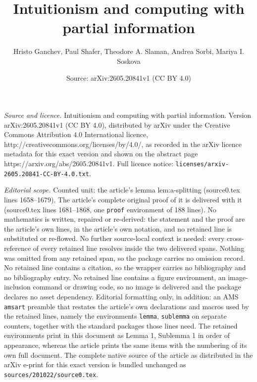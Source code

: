 \documentclass[10pt,a4paper]{amsart}
\title{Intuitionism and computing with partial information}
\author{Hristo Ganchev, Paul Shafer, Theodore A. Slaman, Andrea Sorbi, Mariya I. Soskova}
\date{Source: arXiv:2605.20841v1 (CC BY 4.0)}
\begin{document}
\maketitle

\noindent\emph{Source and licence.} Intuitionism and computing with partial information. Version arXiv:2605.20841v1 (CC BY 4.0), distributed by arXiv under the Creative Commons Attribution 4.0 International licence, http://creativecommons.org/licenses/by/4.0/, as recorded in the arXiv licence metadata for this exact version and shown on the abstract page https://arxiv.org/abs/2605.20841v1. Full licence notice: \texttt{licenses/arxiv-2605.20841-CC-BY-4.0.txt}.\par\smallskip

\noindent\textit{Editorial scope.} Counted unit: the article's lemma lem:a-splitting (source0.tex lines 1658--1679). The article's complete original proof of it is delivered with it (source0.tex lines 1681--1868, one \texttt{proof} environment of 188 lines). No mathematics is written, repaired or re-derived: the statement and the proof are the article's own lines, in the article's own notation, and no retained line is substituted or re-flowed.  No further source-local context is needed: every cross-reference of every retained line resolves inside the two delivered spans.  Nothing was omitted from any retained span, so the package carries no omission record.  No retained line contains a citation, so the wrapper carries no bibliography and no bibliography entry.  No retained line contains a figure environment, an image-inclusion command or drawing code, so no image is delivered and the package declares no asset dependency.  Editorial formatting only, in addition: an AMS \texttt{amsart} preamble that restates the article's own declarations and macros used by the retained lines, namely the environments \texttt{lemma}, \texttt{sublemma} on separate counters, together with the standard packages those lines need.  The retained environments print in this document as Lemma 1, Sublemma 1 in order of appearance, whereas the article prints the same items with the numbering of its own full document.  The complete native source of the article as distributed in the arXiv e-print for this exact version is bundled unchanged as \texttt{sources/201022/source0.tex}.
\end{document}
